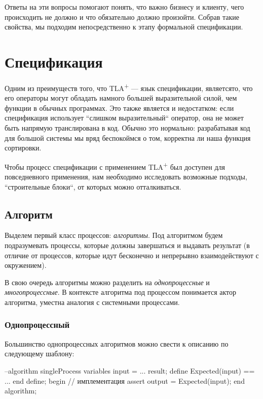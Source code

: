 \documentclass[14pt, openany]{report}
\newcommand{\tlapl}{TLA\textsuperscript{+} }
\begin{document}
Ответы на эти вопросы помогают понять, что важно бизнесу и клиенту, чего происходить не должно и что обязательно должно произойти. Собрав такие свойства, мы подходим непосредственно к этапу формальной спецификации.

\section{Спецификация}
Одним из преимуществ того, что \tlapl --- язык спецификации, являетсято, что его операторы могут обладать намного большей выразительной силой, чем функции в обычных программах. Это также является и недостатком: если спецификация использует ``слишком выразительный`` оператор, она не может быть напрямую транслирована в код. Обычно это нормально: разрабатывая код для большой системы мы вряд беспокоймся о том, корректна ли наша функция сортировки.

Чтобы процесс спецификации с применением \tlapl был доступен для повседневного применения, нам необходимо исследовать возможные подходы, ``строительные блоки``, от которых можно отталкиваться. 

\subsection{Алгоритм}
Выделем первый класс процессов: \emph{алгоритмы}. Под алгоритмом будем подразумевать процессы, которые должны завершаться и выдавать результат (в отличие от процессов, которые идут бесконечно и непрерывно взаимодействуют с окружением).

В свою очередь алгоритмы можно разделить на \emph{однопроцессные} и \emph{многопроцессные}. В контексте алгоритма под процессом понимается актор алгоритма, уместна аналогия с системными процессами.

\subsubsection{Однопроцессный}

Большинство однопроцессных алгоритмов можно свести к описанию по следующему шаблону:
\begin{ppcal}
  --algorithm singleProcess
    variables
      input = ...
      result;
    define
      Expected(input) == ...
    end define;
    begin
      \* // имплементация
      assert output = Expected(input);
    end algorithm;
\end{ppcal}
\begin{tlatex}
%
%
%
%
%
%
%
%
%
%
\@xx{}%
%
%
\end{tlatex}
\end{document}
